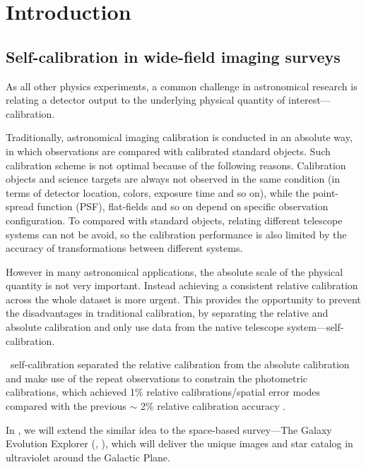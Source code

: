 \chapter*{Introduction}

\newcommand{\pdc}{\project{PDC}}


\section{Self-calibration in wide-field imaging surveys}
As all other physics experiments, a common challenge in astronomical research is relating a detector output to the underlying physical quantity of interest---calibration.

Traditionally, astronomical imaging calibration is conducted in an absolute way, in which observations are compared with calibrated standard objects.
Such calibration scheme is not optimal because of the following reasons. 
Calibration objects and science targets are always not observed in the same condition (in terms of detector location, colors, exposure time and so on), while the point-spread function (PSF), flat-fields and so on depend on specific observation configuration.
To compared with standard objects, relating different telescope systems can not be avoid, so the calibration performance is also limited by the accuracy of transformations between different systems.

However in many astronomical applications,  the absolute scale of the physical quantity is not very important.
Instead achieving a consistent relative calibration across the whole dataset is more urgent.
This provides the opportunity to prevent the disadvantages in traditional calibration, by separating the relative and absolute calibration and only use data from the native telescope system---self-calibration.

\sdss\ self-calibration \citep{uber} separated the relative calibration from the absolute calibration and make use of the repeat observations to constrain the photometric calibrations, which achieved 1\% relative calibrations/spatial error modes compared with the  previous $\sim$ 2\% relative calibration accuracy \citep{sdss2}.

In , we will extend the similar idea to the space-based survey---The Galaxy Evolution Explorer (\galex, \citealt{galex1}), which will deliver the unique images and star catalog in ultraviolet around the Galactic Plane. 

